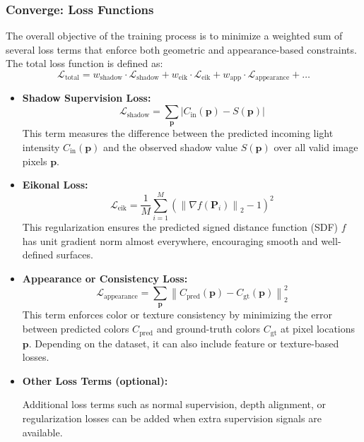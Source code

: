 \documentclass[12pt]{article}
\theoremstyle{definition}
\begin{document}
\subsubsection{Converge: Loss Functions} \label{sec:loss_functions}

The overall objective of the training process is to minimize a weighted sum of several loss terms that enforce both geometric and appearance-based constraints. The total loss function is defined as:
\begin{equation}
\mathcal{L}_{\text{total}} = w_{\text{shadow}} \cdot \mathcal{L}_{\text{shadow}} + w_{\text{eik}} \cdot \mathcal{L}_{\text{eik}} + w_{\text{app}} \cdot \mathcal{L}_{\text{appearance}} + \ldots
\end{equation}

\begin{itemize}
    \item \textbf{Shadow Supervision Loss:}
    \begin{equation}
    \mathcal{L}_{\text{shadow}} = \sum_{\mathbf{p}} \left| C_{\mathrm{in}}(\mathbf{p}) - S(\mathbf{p}) \right|
    \end{equation}
    This term measures the difference between the predicted incoming light intensity $C_{\mathrm{in}}(\mathbf{p})$ and the observed shadow value $S(\mathbf{p})$ over all valid image pixels $\mathbf{p}$.

    \item \textbf{Eikonal Loss:}
    \begin{equation}
    \mathcal{L}_{\text{eik}} = \frac{1}{M} \sum_{i=1}^M \left( \left\| \nabla f(\mathbf{P}_i) \right\|_2 - 1 \right)^2
    \end{equation}
    This regularization ensures the predicted signed distance function (SDF) $f$ has unit gradient norm almost everywhere, encouraging smooth and well-defined surfaces.

    \item \textbf{Appearance or Consistency Loss:}
    \begin{equation}
    \mathcal{L}_{\text{appearance}} = \sum_{\mathbf{p}} \left\| C_{\text{pred}}(\mathbf{p}) - C_{\text{gt}}(\mathbf{p}) \right\|_2^2
    \end{equation}
    This term enforces color or texture consistency by minimizing the error between predicted colors $C_{\text{pred}}$ and ground-truth colors $C_{\text{gt}}$ at pixel locations $\mathbf{p}$. Depending on the dataset, it can also include feature or texture-based losses.

    \item \textbf{Other Loss Terms (optional):}
    
    Additional loss terms such as normal supervision, depth alignment, or regularization losses can be added when extra supervision signals are available.
\end{itemize}
\end{document}
